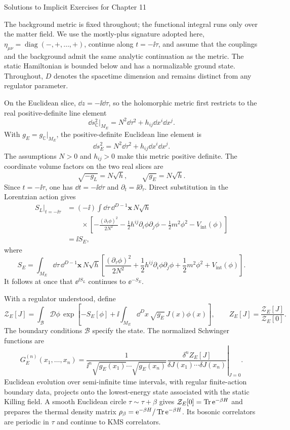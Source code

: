 \begin{bankssolutions}{Solutions to Implicit Exercises for Chapter 11}

The background metric is fixed throughout; the functional integral runs only
over the matter field.  We use the mostly-plus signature adopted here,
$\eta_{\mu\nu}=\operatorname{diag}(-,+,\ldots,+)$, continue along
$t=-\ii\tau$, and assume that the couplings and the background admit the same
analytic continuation as the metric.  The static Hamiltonian is bounded below
and has a normalizable ground state.  Throughout, $D$ denotes the spacetime
dimension and remains distinct from any regulator parameter.

On the Euclidean slice, $\dd z=-\ii\dd\tau$, so the holomorphic metric first
restricts to the real positive-definite line element
\[
 \dd s_{\mathbb C}^2|_{M_E}
 =N^2\dd\tau^2+h_{ij}\dd x^i\dd x^j.
\]
With $g_E=g_{\mathbb C}|_{M_E}$, the positive-definite Euclidean line element
is
\[
 \dd s_E^2
 =N^2\dd\tau^2+h_{ij}\dd x^i\dd x^j.
\]
The assumptions $N>0$ and $h_{ij}>0$ make this metric positive definite.  The
coordinate volume factors on the two real slices are
\[
 \sqrt{-g_L}=N\sqrt h,
 \qquad
 \sqrt{g_E}=N\sqrt h.
\]
Since $t=-\ii\tau$, one has $\dd t=-\ii\dd\tau$ and
$\partial_t=\ii\partial_\tau$.  Direct substitution in the Lorentzian action
gives
\begin{align*}
 S_L\big|_{t=-\ii\tau}
 &=(-\ii)\int\dd\tau\,\dd^{D-1}\mathbf x\,N\sqrt h\\
 &\qquad {}\times\left[
 -\frac{(\partial_\tau\phi)^2}{2N^2}
 -\frac12h^{ij}\partial_i\phi\partial_j\phi
 -\frac12m^2\phi^2-V_{\mathrm{int}}(\phi)
 \right]\\
 &=\ii S_E,
\end{align*}
where
\[
 S_E=\int_{M_E}\dd\tau\,\dd^{D-1}\mathbf x\,N\sqrt h\left[
 \frac{(\partial_\tau\phi)^2}{2N^2}
 +\frac12h^{ij}\partial_i\phi\partial_j\phi
 +\frac12m^2\phi^2+V_{\mathrm{int}}(\phi)
 \right].
\]
It follows at once that $\ee^{\ii S_L}$ continues to $\ee^{-S_E}$.

With a regulator understood, define
\[
 \mathcal Z_E[J]=\int_{\mathcal B}\mathcal D\phi\,
 \exp\left[-S_E[\phi]
 +\ii\int_{M_E}\dd^D x\,\sqrt{g_E}\,J(x)\phi(x)\right],
 \qquad
 Z_E[J]=\frac{\mathcal Z_E[J]}{\mathcal Z_E[0]}.
\]
The boundary conditions $\mathcal B$ specify the state.  The normalized
Schwinger functions are
\[
 G_E^{(n)}(x_1,\ldots,x_n)
 =\left.\frac{1}{\ii^n\sqrt{g_E(x_1)}\cdots\sqrt{g_E(x_n)}}
 \frac{\delta^n Z_E[J]}
 {\delta J(x_1)\cdots\delta J(x_n)}\right|_{J=0}.
\]
Euclidean evolution over semi-infinite time intervals, with regular
finite-action boundary data, projects onto the lowest-energy state associated
with the static Killing field.  A smooth Euclidean circle
$\tau\sim\tau+\beta$ gives
$\mathcal Z_E[0]=\operatorname{Tr}\mathrm{e}^{-\beta H}$ and prepares the thermal density matrix
$\rho_\beta=\mathrm{e}^{-\beta H}/\operatorname{Tr}\mathrm{e}^{-\beta H}$.  Its bosonic correlators are
periodic in $\tau$ and continue to KMS correlators.


\end{bankssolutions}
